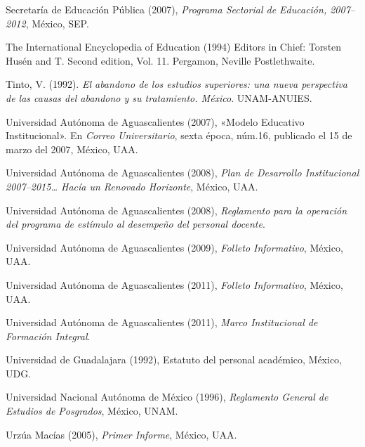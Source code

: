 Secretaría de Educación Pública (2007), \textit{Programa Sectorial de
Educación, 2007--2012}, México, SEP.

\begin{sloppypar}
The International Encyclopedia of Education (1994) Editors in Chief:
Torsten Husén and T. Second edition, Vol. 11. Pergamon, Neville
Postlethwaite.
\end{sloppypar}


Tinto, V. (1992). \textit{El abandono de los estudios superiores: una nueva
perspectiva de las causas del abandono y su tratamiento. México}.
UNAM-ANUIES.

Universidad Autónoma de Aguascalientes (2007), «Modelo Educativo
Institucional». En \textit{Correo Universitario}, sexta época, núm.16,
publicado el 15 de marzo del 2007, México, UAA.

Universidad Autónoma de Aguascalientes (2008), \textit{Plan de Desarrollo
Institucional 2007--2015… Hacía un Renovado Horizonte}, México, UAA.

Universidad Autónoma de Aguascalientes (2008), \textit{Reglamento para la
operación del programa de estímulo al desempeño del personal docente}.

Universidad Autónoma de Aguascalientes (2009), \textit{Folleto Informativo},
México, UAA.

Universidad Autónoma de Aguascalientes (2011), \textit{Folleto Informativo},
México, UAA.
\newpage

Universidad Autónoma de Aguascalientes (2011), \textit{Marco Institucional
de Formación Integral}.

Universidad de Guadalajara (1992), Estatuto del personal académico, México,
UDG.

Universidad Nacional Autónoma de México (1996), \textit{Reglamento General
de Estudios de Posgrados}, México, UNAM.

Urzúa Macías (2005), \textit{Primer Informe}, México, UAA.
\newpage
\thispagestyle{empty}
\phantom{abc}
